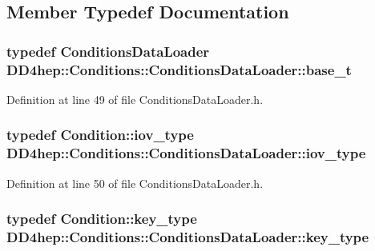 \subsection{Member Typedef Documentation}
\hypertarget{class_d_d4hep_1_1_conditions_1_1_conditions_data_loader_a22a3a55163245ff24bca31db419433be}{
\subsubsection[{base\_\-t}]{\setlength{\rightskip}{0pt plus 5cm}typedef {\bf ConditionsDataLoader} {\bf DD4hep::Conditions::ConditionsDataLoader::base\_\-t}}}
\label{class_d_d4hep_1_1_conditions_1_1_conditions_data_loader_a22a3a55163245ff24bca31db419433be}


Definition at line 49 of file ConditionsDataLoader.h.\hypertarget{class_d_d4hep_1_1_conditions_1_1_conditions_data_loader_a510aa9a02f5e798d8d96c9e3cb5a36af}{
\subsubsection[{iov\_\-type}]{\setlength{\rightskip}{0pt plus 5cm}typedef {\bf Condition::iov\_\-type} {\bf DD4hep::Conditions::ConditionsDataLoader::iov\_\-type}}}
\label{class_d_d4hep_1_1_conditions_1_1_conditions_data_loader_a510aa9a02f5e798d8d96c9e3cb5a36af}


Definition at line 50 of file ConditionsDataLoader.h.\hypertarget{class_d_d4hep_1_1_conditions_1_1_conditions_data_loader_ac17b71656c9d6b5365c62d1d606ba8cc}{
\subsubsection[{key\_\-type}]{\setlength{\rightskip}{0pt plus 5cm}typedef {\bf Condition::key\_\-type} {\bf DD4hep::Conditions::ConditionsDataLoader::key\_\-type}}}
\label{class_d_d4hep_1_1_conditions_1_1_conditions_data_loader_ac17b71656c9d6b5365c62d1d606ba8cc}


